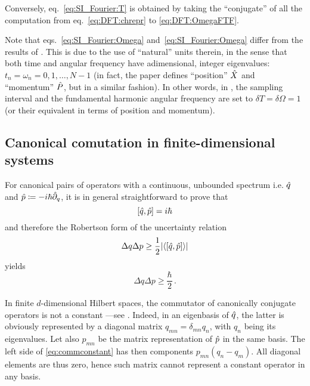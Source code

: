Conversely, eq.~\eqref{eq:SI_Fourier:T} is obtained by
taking the ``conjugate'' of all the computation
from eq.~\eqref{eq:DFT:chrepr} to \eqref{eq:DFT:OmegaFTF}.

Note that eqs.~\eqref{eq:SI_Fourier:Omega} and~\eqref{eq:SI_Fourier:Omega}
differ from the results of \cite{FiniteHilb}.
This is due to the use of
``natural'' units therein,
in the sense that
both time and angular frequency
have adimensional, integer eigenvalues:
$t_n = \omega_n = 0, 1, \dots, N-1$
(in fact, the paper defines ``position'' $\hat{X}$ and ``momentum'' $\hat{P}$,
but in a similar fashion).
In other words, in \citereset\cite{FiniteHilb}, the sampling interval and the fundamental harmonic angular frequency
are set to $\delta{T} = \delta{\Omega} = 1$ (or their equivalent in terms of position and momentum).

\subsection{Canonical comutation in finite-dimensional systems}\label{sec:finite_uncertainty}
\citereset
For canonical pairs of operators with a continuous, unbounded spectrum i.e.
$\hat{q}$ and $\hat{p} \coloneqq -i\hbar\hat{\partial}_{q}$,
it is in general straightforward to prove that
\begin{equation}\label{eq:commconstant}
  \qty[\hat{q}, \hat{p}] = i\hbar
\end{equation}
and therefore
the Robertson form of the uncertainty relation
\begin{equation}\label{eq:robertsonconstant}
  \Delta q \Delta p \geq { \frac{1}{2} \qty|\ev{\qty[\op{q}, \op{p}]}| }
\end{equation}
yields
\begin{equation}\label{eq:min_uncertain_constant}
  \Delta q \Delta p \geq { \frac{\hbar}{2} } \, \text{.}
\end{equation}

In finite $d$-dimensional Hilbert spaces, the commutator of canonically conjugate operators
is not a constant ---see \cite{Weyl:FiniteComm}.
Indeed, in an eigenbasis of $\hat{q}$,
the latter is obviously represented by a diagonal matrix $q_{mn} = \delta_{mn}q_{n}$,
with $q_n$ being its eigenvalues.
Let also $p_{mn}$ be the matrix representation of $\hat{p}$ in the same basis.
The left side of \eqref{eq:commconstant} has then components
$p_{mn}(q_n - q_m)$. All diagonal elements are thus zero,
hence such matrix cannot represent a constant operator in any basis.

